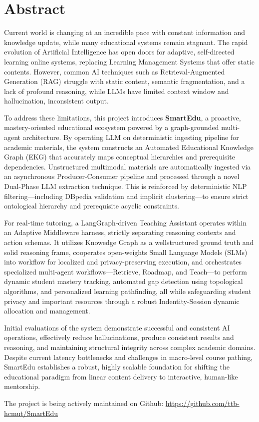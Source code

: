 \section*{Abstract}
\thispagestyle{empty}
Current world is changing at an incredible pace with constant information and knowledge update, while many educational systems remain stagnant. The rapid evolution of 
Artificial Intelligence has open doors for adaptive, self-directed learning online systems, replacing Learning Management Systems that offer static contents. 
However, common AI techniques such as Retrieval-Augmented Generation (RAG) struggle with static content, semantic fragmentation, and a lack of profound reasoning, while LLMs have limited 
context window and hallucination, inconsistent output.

To address these limitations, this project introduces \textbf{SmartEdu}, a proactive, mastery-oriented educational ecosystem powered by a graph-grounded multi-agent 
architecture.
By operating LLM on deterministic ingesting pipeline for academic materials, the system constructs an Automated Educational Knowledge Graph (EKG) that accurately 
maps conceptual hierarchies and prerequisite dependencies.  
Unstructured multimodal materials are automatically ingested via an asynchronous Producer-Consumer pipeline and processed through a novel Dual-Phase LLM extraction 
technique. This is reinforced by deterministic NLP filtering—including DBpedia validation and implicit clustering—to ensure strict ontological hierarchy and 
prerequisite acyclic constraints.

For real-time tutoring, a LangGraph-driven Teaching Assistant operates within an Adaptive Middleware harness, strictly separating reasoning contexts and action schemas. 
It utilizes Knowedge Graph as a well\-structured ground truth and solid reasoning frame, cooperates open-weights Small Language Models (SLMs) into workflow 
for localized and privacy-preserving execution, and
orchestrates specialized multi-agent workflows—Retrieve, Roadmap, and Teach—to perform dynamic student mastery tracking, automated gap detection
using topological algorithms, and personalized learning pathfinding, all while safeguarding student privacy and important resources through a robust 
Indentity-Session dynamic allocation and management.

Initial evaluations of the system demonstrate successful and consistent AI operations, effectively reduce hallucinations, produce consistent results and reasoning, and 
maintaining structural integrity across complex academic domains. Despite current latency bottlenecks and challenges in macro-level course pathing, 
SmartEdu establishes a robust, highly scalable foundation for shifting the educational paradigm from linear content delivery to interactive, 
human-like mentorship.

The project is being actively maintained on Github: \url{https://github.com/ttb-hcmut/SmartEdu}

\clearpage
{}

